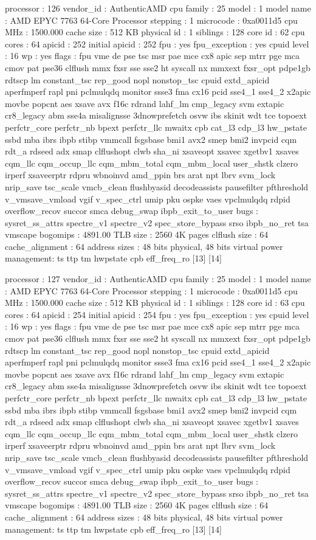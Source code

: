 processor	: 126
vendor_id	: AuthenticAMD
cpu family	: 25
model		: 1
model name	: AMD EPYC 7763 64-Core Processor
stepping	: 1
microcode	: 0xa0011d5
cpu MHz		: 1500.000
cache size	: 512 KB
physical id	: 1
siblings	: 128
core id		: 62
cpu cores	: 64
apicid		: 252
initial apicid	: 252
fpu		: yes
fpu_exception	: yes
cpuid level	: 16
wp		: yes
flags		: fpu vme de pse tsc msr pae mce cx8 apic sep mtrr pge mca cmov pat pse36 clflush mmx fxsr sse sse2 ht syscall nx mmxext fxsr_opt pdpe1gb rdtscp lm constant_tsc rep_good nopl nonstop_tsc cpuid extd_apicid aperfmperf rapl pni pclmulqdq monitor ssse3 fma cx16 pcid sse4_1 sse4_2 x2apic movbe popcnt aes xsave avx f16c rdrand lahf_lm cmp_legacy svm extapic cr8_legacy abm sse4a misalignsse 3dnowprefetch osvw ibs skinit wdt tce topoext perfctr_core perfctr_nb bpext perfctr_llc mwaitx cpb cat_l3 cdp_l3 hw_pstate ssbd mba ibrs ibpb stibp vmmcall fsgsbase bmi1 avx2 smep bmi2 invpcid cqm rdt_a rdseed adx smap clflushopt clwb sha_ni xsaveopt xsavec xgetbv1 xsaves cqm_llc cqm_occup_llc cqm_mbm_total cqm_mbm_local user_shstk clzero irperf xsaveerptr rdpru wbnoinvd amd_ppin brs arat npt lbrv svm_lock nrip_save tsc_scale vmcb_clean flushbyasid decodeassists pausefilter pfthreshold v_vmsave_vmload vgif v_spec_ctrl umip pku ospke vaes vpclmulqdq rdpid overflow_recov succor smca debug_swap ibpb_exit_to_user
bugs		: sysret_ss_attrs spectre_v1 spectre_v2 spec_store_bypass srso ibpb_no_ret tsa vmscape
bogomips	: 4891.00
TLB size	: 2560 4K pages
clflush size	: 64
cache_alignment	: 64
address sizes	: 48 bits physical, 48 bits virtual
power management: ts ttp tm hwpstate cpb eff_freq_ro [13] [14]

processor	: 127
vendor_id	: AuthenticAMD
cpu family	: 25
model		: 1
model name	: AMD EPYC 7763 64-Core Processor
stepping	: 1
microcode	: 0xa0011d5
cpu MHz		: 1500.000
cache size	: 512 KB
physical id	: 1
siblings	: 128
core id		: 63
cpu cores	: 64
apicid		: 254
initial apicid	: 254
fpu		: yes
fpu_exception	: yes
cpuid level	: 16
wp		: yes
flags		: fpu vme de pse tsc msr pae mce cx8 apic sep mtrr pge mca cmov pat pse36 clflush mmx fxsr sse sse2 ht syscall nx mmxext fxsr_opt pdpe1gb rdtscp lm constant_tsc rep_good nopl nonstop_tsc cpuid extd_apicid aperfmperf rapl pni pclmulqdq monitor ssse3 fma cx16 pcid sse4_1 sse4_2 x2apic movbe popcnt aes xsave avx f16c rdrand lahf_lm cmp_legacy svm extapic cr8_legacy abm sse4a misalignsse 3dnowprefetch osvw ibs skinit wdt tce topoext perfctr_core perfctr_nb bpext perfctr_llc mwaitx cpb cat_l3 cdp_l3 hw_pstate ssbd mba ibrs ibpb stibp vmmcall fsgsbase bmi1 avx2 smep bmi2 invpcid cqm rdt_a rdseed adx smap clflushopt clwb sha_ni xsaveopt xsavec xgetbv1 xsaves cqm_llc cqm_occup_llc cqm_mbm_total cqm_mbm_local user_shstk clzero irperf xsaveerptr rdpru wbnoinvd amd_ppin brs arat npt lbrv svm_lock nrip_save tsc_scale vmcb_clean flushbyasid decodeassists pausefilter pfthreshold v_vmsave_vmload vgif v_spec_ctrl umip pku ospke vaes vpclmulqdq rdpid overflow_recov succor smca debug_swap ibpb_exit_to_user
bugs		: sysret_ss_attrs spectre_v1 spectre_v2 spec_store_bypass srso ibpb_no_ret tsa vmscape
bogomips	: 4891.00
TLB size	: 2560 4K pages
clflush size	: 64
cache_alignment	: 64
address sizes	: 48 bits physical, 48 bits virtual
power management: ts ttp tm hwpstate cpb eff_freq_ro [13] [14]

